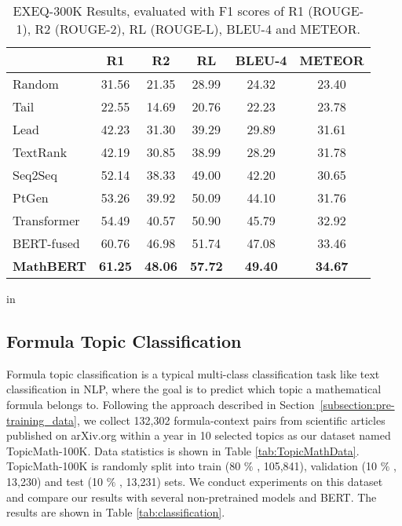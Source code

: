 \documentclass{article}
\begin{document}
\begin{table}[!t]
\begin{center}
\setlength{\tabcolsep}{1.4mm}
\begin{tabular}{lccccc}
\toprule
            & R1    & R2    & RL    & BLEU-4 & METEOR \\
\hline        
Random      & 31.56 & 21.35 & 28.99 & 24.32  & 23.40 \\
Tail        & 22.55 & 14.69 & 20.76 & 22.23  & 23.78 \\
Lead        & 42.23 & 31.30 & 39.29 & 29.89  & 31.61 \\
TextRank    & 42.19 & 30.85 & 38.99 & 28.29  & 31.78 \\
\hline
Seq2Seq     & 52.14 & 38.33 & 49.00 & 42.20  & 30.65 \\
PtGen       & 53.26 & 39.92 & 50.09 & 44.10  & 31.76 \\
Transformer & 54.49 & 40.57 & 50.90 & 45.79  & 32.92 \\
\hline
BERT-fused        & 60.76 & 46.98 & 51.74 & 47.08  & 33.46 \\
\textbf{MathBERT}    & \textbf{61.25}  & \textbf{48.06}  & \textbf{57.72} & \textbf{49.40}   & \textbf{34.67}   \\
\bottomrule
\end{tabular}
\end{center}
\vskip -0.1in
\caption{EXEQ-300K Results, evaluated with F1 scores of R1 (ROUGE-1), R2 (ROUGE-2), RL (ROUGE-L), BLEU-4 and METEOR.}
\label{tab:generation}
 in
\end{table}

\subsection{Formula Topic Classification}

Formula topic classification is a typical multi-class classification task like text classification in NLP, where the goal is to predict which topic a mathematical formula belongs to. Following the approach described in Section~\ref{subsection:pre-training_data}, we collect 132,302 formula-context pairs from scientific articles published on arXiv.org within a year in 10 selected topics as our dataset named TopicMath-100K. Data statistics is shown in Table \ref{tab:TopicMathData}. TopicMath-100K is randomly split into train (80 $\%$ , 105,841), validation (10 $\%$ , 13,230) and test (10 $\%$ , 13,231) sets. We conduct experiments on this dataset and compare our results with several non-pretrained models and BERT. The results are shown in Table \ref{tab:classification}.
\end{document}

